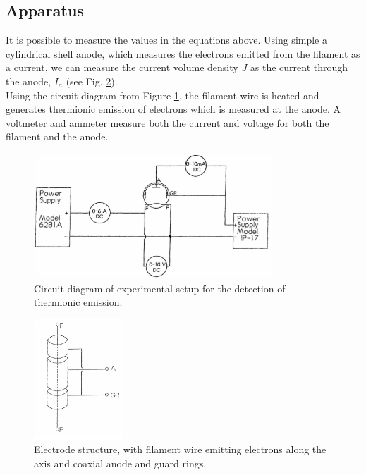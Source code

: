 \subsection{Apparatus}
It is possible to measure the values in the equations above. Using simple a cylindrical shell anode, which measures the electrons emitted from the filament as a current, we can measure the current volume density $J$ as the current through the anode, $I_a$ (see Fig. \ref{Electrode}). \\

Using the circuit diagram from Figure \ref{Circuit}, the filament wire is heated and generates thermionic emission of electrons which is measured at the anode. A voltmeter and ammeter measure both the current and voltage for both the filament and the anode.\\

\begin{figure}[H]
\centering
\includegraphics[width=0.8\textwidth]{figures/CircuitDiagram.png}
\caption{Circuit diagram of experimental setup for the detection of thermionic emission.}
\label{Circuit}
\end{figure}

\begin{figure}[H]
\centering
\includegraphics[width=0.3\textwidth]{figures/ElectrodeStructure.png}
\caption{Electrode structure, with filament wire emitting electrons along the axis and coaxial anode and guard rings.}
\label{Electrode}
\end{figure}

